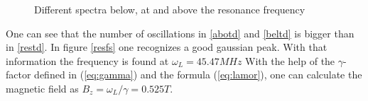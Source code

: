 \begin{figure}[h]
            \caption{Different spectra below, at and above the resonance frequency}
         \end{figure}
     One can see that the number of oscillations in \ref{abotd} and \ref{beltd} is bigger than in \ref{restd}. In figure \ref{resfs} one recognizes a good gaussian peak.
     With that information the frequency is found at $\omega_L = 45.47\unit{MHz}$ With the help of the $\gamma$-factor defined in (\ref{eq:gamma}) and the formula (\ref{eq:lamor}), one can calculate the magnetic field as $B_z = \omega_L/\gamma = 0.525\unit{T}$.
         
